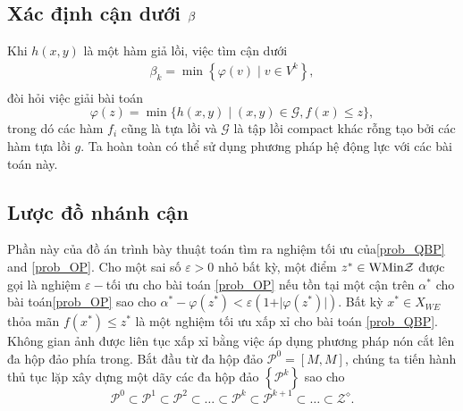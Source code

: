 \subsection{Xác định cận dưới $\bf{\beta}$}
Khi $h(x,y)$ là một hàm giả lồi, việc tìm cận dưới
\[
\begin{array}{c}
\beta_{k}=\min\left\{ \varphi(v)\mid v\in V^{k}\right\} ,\\
\end{array}
\]
đòi hỏi việc giải bài toán
\[
\varphi(z)=\min\{h(x,y)\mid (x,y)\in\mathcal{G},f(x)\leq z\},
\]
\noindent trong dó các hàm $f_{i}$ cũng là tựa lồi và $\mathcal{G}$ là tập lồi compact khác rỗng tạo bởi các hàm tựa lồi $g$. Ta hoàn toàn có thể sử dụng phương pháp hệ động lực với các bài toán này.

\subsection{Lược đồ nhánh cận }
Phần này của đồ án trình bày thuật toán tìm ra nghiệm tối ưu của\ref{prob_QBP} and \ref{prob_OP}. Cho một sai số $\varepsilon>0$ nhỏ bất kỳ, một điểm $z^{*}\in{\rm WMin}\mathcal{Z}$ được gọi là nghiệm $\varepsilon-$tối ưu cho bài toán \ref{prob_OP} nếu tồn tại một cận trên $\alpha^{*}$ cho bài toán\ref{prob_OP} sao cho $\alpha^{*}-\varphi(z^{*})<\varepsilon(1+\vert\varphi(z^{*})\vert)$. Bất kỳ $x^{*}\in X_{WE}$ thỏa mãn $f(x^{*})\le z^{*}$ là một nghiệm tối ưu xấp xỉ cho bài toán \ref{prob_QBP}.\\

Không gian ảnh được liên tục xấp xỉ bằng việc áp dụng phương pháp nón cắt lên đa hộp đảo phía trong. Bắt đầu từ đa hộp đảo $\mathcal{P}^{0}=\left[M,M\right]$, chúng ta tiến hành thủ tục lặp xây dựng một dãy các đa hộp đảo $\left\{ \mathcal{P}^{k}\right\} $ sao cho
\[
\mathcal{P}^{0}\subset\mathcal{P}^{1}\subset\mathcal{P}^{2}\subset\dots\subset\mathcal{P}^{k}\subset\mathcal{P}^{k+1}\subset\dots\subset\mathcal{Z}^{\diamond}.
\]



